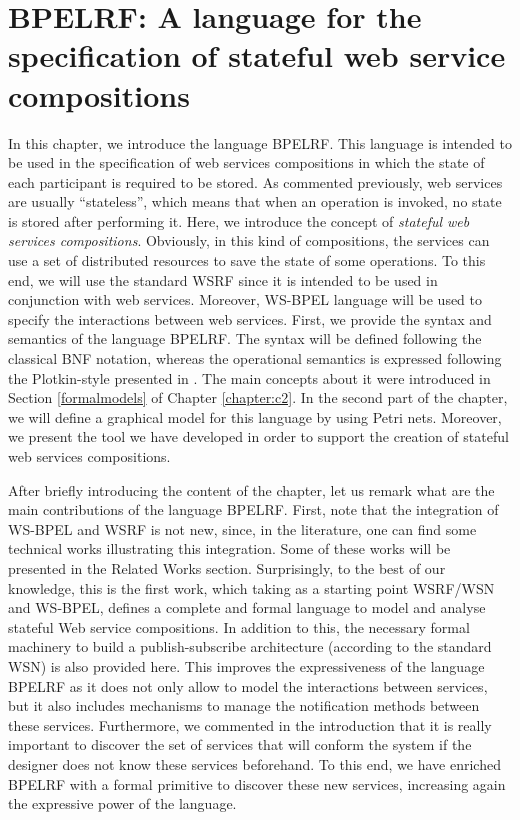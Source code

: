 \chapter{BPELRF: A language for the specification of stateful web service compositions}\label{chapter:c4}

In this chapter, we introduce the language BPELRF. This language is intended to be used in the specification of web services compositions in which the state
of each participant is required to be stored. As commented previously, web services are usually ``stateless'', which means that when an operation is invoked, no 
state is stored after performing it. Here, we introduce the concept of \emph{stateful web services compositions}. Obviously, in this kind of compositions,
the services can use a set of distributed resources to save the state of some operations. To this end, we will use the standard WSRF since it is intended to be used 
in conjunction with web services. Moreover, WS-BPEL language will be used to specify the interactions between web services. First, we provide the syntax and semantics of the language BPELRF. The syntax will be defined following the classical BNF notation, whereas the operational semantics is expressed following the Plotkin-style presented in \cite{Plotkin81}. The main concepts about it were introduced in Section \ref{formalmodels} of Chapter \ref{chapter:c2}. In the second part of the chapter, we will define a graphical model for this language by using Petri nets. Moreover, we present the tool we have developed in order to support the creation of stateful web services compositions. 

After briefly introducing the content of the chapter, let us remark what are the main contributions of the language BPELRF. First, note that 
the integration of WS-BPEL and WSRF is not new, since, in the literature, one can find some technical works illustrating this integration. Some of these works will be presented in the Related Works section. Surprisingly, to the best of our knowledge, this is the first work, which taking as a starting point WSRF/WSN and WS-BPEL, defines a complete and formal language to model and analyse stateful Web service compositions. In addition to this, the necessary formal machinery to build a publish-subscribe architecture (according to the standard WSN) is also provided here. This improves the expressiveness of the language BPELRF 
as it does not only allow to model the interactions between services, but it also includes mechanisms to manage the notification methods between these services. Furthermore, we commented in the introduction that it is really important to discover the set of services that will conform the system if the designer does not know these services beforehand. To this end, we have enriched BPELRF with a formal primitive to discover these new services, increasing again the expressive power of the language. 


